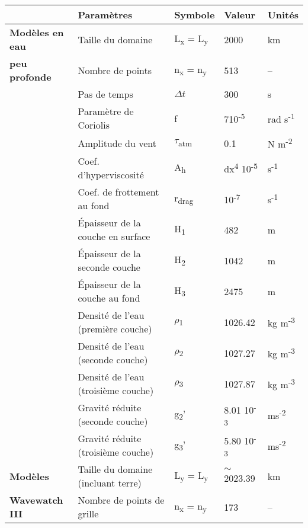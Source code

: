 \documentclass[10pt]{report}
\numberwithin{equation}{section}
\begin{document}
\begin{center}
\begin{tabular}{lllll}
\hline
\hline
 & Paramètres & Symbole & Valeur & Unités\\[0pt]
\hline
\textbf{Modèles en eau} & Taille du domaine & L\textsubscript{x} = L\textsubscript{y} & 2000 & km\\[0pt]
\textbf{peu profonde} & Nombre de points & n\textsubscript{x} = n\textsubscript{y} & 513 & --\\[0pt]
 & Pas de temps & \(\Delta t\) & 300 & s\\[0pt]
 & Paramètre de Coriolis & f & 7\texttimes{}10\textsuperscript{-5} & rad s\textsuperscript{-1}\\[0pt]
 & Amplitude du vent & \(\tau\)\textsubscript{atm} & 0.1 & N m\textsuperscript{-2}\\[0pt]
 & Coef. d'hyperviscosité & A\textsubscript{h} & dx\textsuperscript{4} \texttimes{}10\textsuperscript{-5} & s\textsuperscript{-1}\\[0pt]
 & Coef. de frottement au fond & r\textsubscript{drag} & 10\textsuperscript{-7} & s\textsuperscript{-1}\\[0pt]
 & Épaisseur de la couche en surface & H\textsubscript{1} & 482 & m\\[0pt]
 & Épaisseur de la seconde couche & H\textsubscript{2} & 1042 & m\\[0pt]
 & Épaisseur de la couche au fond & H\textsubscript{3} & 2475 & m\\[0pt]
 & Densité de l'eau (première couche) & \(\rho\)\textsubscript{1} & 1026.42 & kg m\textsuperscript{-3}\\[0pt]
 & Densité de l'eau (seconde couche) & \(\rho\)\textsubscript{2} & 1027.27 & kg m\textsuperscript{-3}\\[0pt]
 & Densité de l'eau (troisième couche) & \(\rho\)\textsubscript{3} & 1027.87 & kg m\textsuperscript{-3}\\[0pt]
 & Gravité réduite (seconde couche) & g\textsubscript{2}' & 8.01 \texttimes{} 10\textsuperscript{-3} & ms\textsuperscript{-2}\\[0pt]
 & Gravité réduite (troisième couche) & g\textsubscript{3}' & 5.80 \texttimes{} 10\textsuperscript{-3} & ms\textsuperscript{-2}\\[0pt]
\hline
\hline
\textbf{Modèles} & Taille du domaine (incluant terre) & L\textsubscript{y} = L\textsubscript{y} & \(\sim\) 2023.39 & km\\[0pt]
\textbf{Wavewatch III} & Nombre de points de grille & n\textsubscript{x} = n\textsubscript{y} & 173 & --\\[0pt]

\end{tabular}
\end{center}
\end{document}
